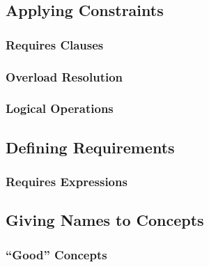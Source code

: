 \subsection{Applying Constraints} \label{sec:applying_constraints}

    \subsubsection{Requires Clauses} \label{sec:requires_clauses}

    \subsubsection{Overload Resolution} \label{sec:overload_resolution}

    \subsubsection{Logical Operations} \label{sec:logical_operations}

\subsection{Defining Requirements} \label{sec:defining_requirements}

    \subsubsection{Requires Expressions} \label{sec:requires_expressions}

\subsection{Giving Names to Concepts} \label{sec:giving_names_to_concepts}

    \subsubsection{``Good'' Concepts} \label{sec:good_concepts}
